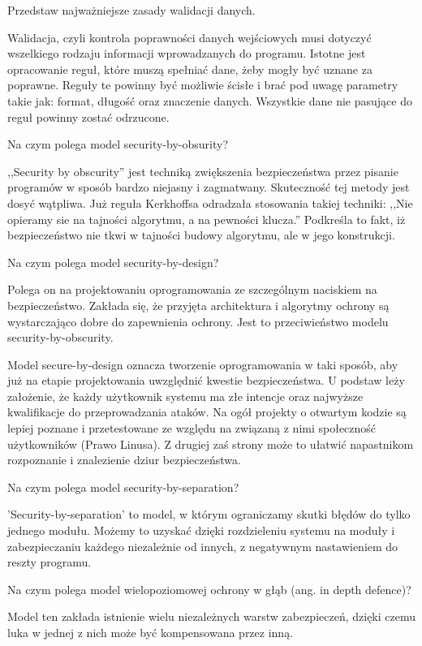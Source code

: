 \documentclass[answers,11pt]{exam}
\begin{document}
\begin{questions}
\question Przedstaw najważniejsze zasady walidacji danych.
\begin{solution}
Walidacja, czyli kontrola poprawności danych wejściowych musi dotyczyć wszelkiego rodzaju informacji wprowadzanych do programu. Istotne jest opracowanie reguł, które muszą spełniać dane, żeby mogły być uznane za poprawne. Reguły te powinny być możliwie ścisłe i brać pod uwagę parametry takie jak: format, długość oraz znaczenie danych. Wszystkie dane nie pasujące do reguł powinny zostać odrzucone.  
\end{solution}

\question Na czym polega model security-by-obsurity?
\begin{solution}
,,Security by obscurity'' jest techniką zwiększenia bezpieczeństwa przez pisanie programów w sposób bardzo niejasny i zagmatwany. Skuteczność tej metody jest dosyć wątpliwa.
Już reguła Kerkhoffsa odradzała stosowania takiej techniki: ,,Nie opieramy sie na tajności algorytmu, a na pewności klucza.'' Podkreśla to fakt, iż bezpieczeństwo nie tkwi w tajności budowy algorytmu, ale w jego konstrukcji.
\end{solution}

\question Na czym polega model security-by-design?
\begin{solution}
Polega on na projektowaniu oprogramowania ze szczególnym naciskiem na bezpieczeństwo. Zakłada się, że przyjęta architektura i algorytmy ochrony są wystarczająco dobre do zapewnienia ochrony. Jest to przeciwieństwo modelu security-by-obscurity.

Model secure-by-design oznacza tworzenie oprogramowania w taki sposób, aby już na etapie projektowania uwzględnić kwestie bezpieczeństwa. U podstaw leży założenie, że każdy użytkownik systemu ma złe intencje oraz najwyższe kwalifikacje do przeprowadzania ataków. Na ogół projekty o otwartym kodzie są lepiej poznane i przetestowane ze względu na związaną z nimi społeczność użytkowników (Prawo Linusa).  Z drugiej zaś strony może to ułatwić napastnikom rozpoznanie i znalezienie dziur bezpieczeństwa. 

\end{solution}

\question Na czym polega model security-by-separation?
\begin{solution}
'Security-by-separation' to model, w którym ograniczamy skutki błędów do tylko jednego modułu. Możemy to uzyskać dzięki rozdzieleniu systemu na moduły i zabezpieczaniu każdego  niezależnie od innych, z negatywnym nastawieniem do reszty programu.
\end{solution}

\question Na czym polega model wielopoziomowej ochrony w głąb (ang. in depth defence)?
\begin{solution}
Model ten zakłada istnienie wielu niezależnych warstw zabezpieczeń, dzięki czemu luka w jednej z nich może być kompensowana przez inną. 
\end{solution}
\end{questions}
\end{document}
